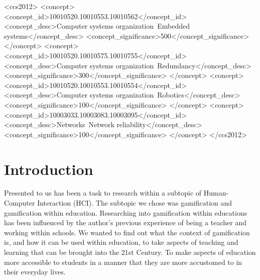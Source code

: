 \documentclass[sigchi]{acmart}
\begin{document}
\begin{CCSXML}
<ccs2012>
 <concept>
  <concept_id>10010520.10010553.10010562</concept_id>
  <concept_desc>Computer systems organization~Embedded systems</concept_desc>
  <concept_significance>500</concept_significance>
 </concept>
 <concept>
  <concept_id>10010520.10010575.10010755</concept_id>
  <concept_desc>Computer systems organization~Redundancy</concept_desc>
  <concept_significance>300</concept_significance>
 </concept>
 <concept>
  <concept_id>10010520.10010553.10010554</concept_id>
  <concept_desc>Computer systems organization~Robotics</concept_desc>
  <concept_significance>100</concept_significance>
 </concept>
 <concept>
  <concept_id>10003033.10003083.10003095</concept_id>
  <concept_desc>Networks~Network reliability</concept_desc>
  <concept_significance>100</concept_significance>
 </concept>
</ccs2012>
\end{CCSXML}




\maketitle

\section{Introduction}
Presented to us has been a task to research within a subtopic of Human-Computer Interaction (HCI). The subtopic we chose was gamification and gamification within education. Researching into gamification within educations has been influenced by the author's previous experience of being a teacher and working within schools. We wanted to find out what the context of gamification is, and how it can be used within education, to take aspects of teaching and learning that can be brought into the 21st Century. To make aspects of education more accessible to students in a manner that they are more accustomed to in their everyday lives. 
\end{document}
